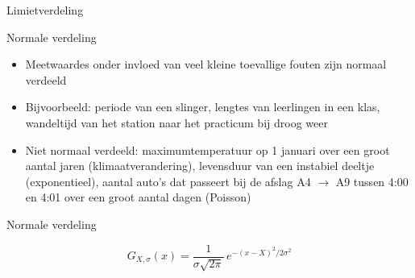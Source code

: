 \documentclass{beamer}
\begin{document}
\begin{frame}{Limietverdeling}
  \begin{center}





  \end{center}
\end{frame}

\begin{frame}{Normale verdeling}
  \begin{itemize}
    \item Meetwaardes onder invloed van veel kleine toevallige fouten zijn \alert{normaal verdeeld}
    \item<2-> Bijvoorbeeld: periode van een slinger, lengtes van leerlingen in een klas, wandeltijd van het station naar het practicum bij droog weer
    \item<3-> Niet normaal verdeeld: maximumtemperatuur op 1 januari over een groot aantal jaren (klimaatverandering), levensduur van een instabiel deeltje (exponentieel), aantal auto's dat passeert bij de afslag A4 $\rightarrow$ A9 tussen 4:00 en 4:01 over een groot aantal dagen (Poisson)
  \end{itemize}
\end{frame}

\begin{frame}{Normale verdeling}
  \begin{center}
  \end{center}
  \begin{equation*}
    G_{X,\sigma}(x) = \frac{1}{\sigma\sqrt{2\pi}}\,e^{-(x - X)^2 / 2\sigma^2}
  \end{equation*}
\end{frame}
\end{document}
